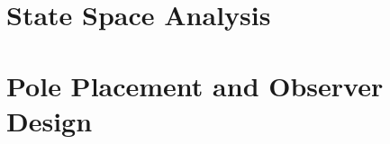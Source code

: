 \documentclass[11pt]{report}
\begin{document}
\tableofcontents



\chapter{State Space Analysis}


\chapter{Pole Placement and Observer Design}

\end{document}
